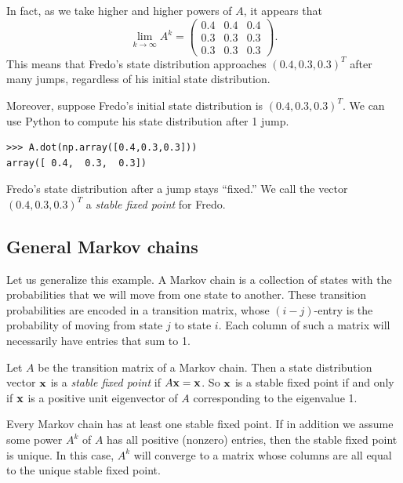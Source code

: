 In fact, as we take higher and higher powers of $A$, it appears that 
\[
\lim_{k \rightarrow \infty} A^k = \begin{pmatrix}
0.4 & 0.4 & 0.4\\
0.3 & 0.3 & 0.3\\
0.3 & 0.3 & 0.3
\end{pmatrix}.
\]
This means that Fredo's state distribution approaches $(0.4, 0.3, 0.3)^T$ after many jumps, regardless of his initial state distribution.

Moreover, suppose Fredo's initial state distribution is $(0.4, 0.3, 0.3)^T$. 
We can use Python to compute his state distribution after 1 jump.
\begin{lstlisting}
>>> A.dot(np.array([0.4,0.3,0.3]))
array([ 0.4,  0.3,  0.3])
\end{lstlisting} 
Fredo's state distribution after a jump stays ``fixed.'' We call the vector $(0.4, 0.3, 0.3)^T$ a \emph{stable fixed point} for Fredo.


\subsection*{General Markov chains}
Let us generalize this example. A Markov chain is a collection of states with the probabilities that we will move from one state to another. 
These transition probabilities are encoded in a transition matrix, whose $(i-j)$-entry is the probability of moving from state $j$ to state $i$. 
Each column of such a matrix will necessarily have entries that sum to 1. 


Let $A$ be the transition matrix of a Markov chain. 
Then a state distribution vector ${\bf x}$ is a \emph{stable fixed point} if $A{\bf x}={\bf x}$. 
So ${\bf x}$ is a stable fixed point if and only if ${\bf x}$ is a positive unit eigenvector of $A$ corresponding to the eigenvalue 1. 


Every Markov chain has at least one stable fixed point. 
If in addition we assume some power $A^k$ of $A$ has all positive (nonzero) entries, then the stable fixed point is unique. 
In this case, $A^k$ will converge to a matrix whose columns are all equal to the unique stable fixed point.

